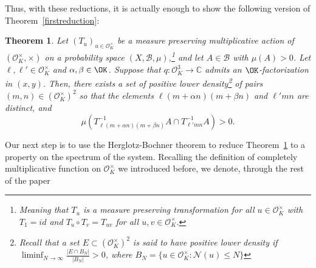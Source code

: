 \documentclass[11pt]{amsart}
\newtheorem{theorem}[lemma]{Theorem}
\theoremstyle{definition}
\newcommand{\C}{{\mathbb C}}
\newcommand{\NN}{{\mathcal N}}
\newcommand{\FM}[1]{{\color{violet}{{#1}}}}
\begin{document}
Thus, with these reductions, it is actually enough to show the following version of Theorem~\ref{firstreduction}:
\fi


\begin{theorem}\label{firstreductionplus}
Let $(T_u)_{u \in\mathcal{O}_K^{\times}}$ be a measure preserving multiplicative action of $(\mathcal{O}_K^{\times},\times)$ on a probability space $(X,\mathcal{B},\mu)$,\footnote{Meaning that $T_{u}$ is a measure preserving transformation for all $u \in\mathcal{O}_K^{\times}$ with $T_{1}=id$ and $T_{u}\circ T_{v}=T_{uv}$ for all $u,v\in\mathcal{O}_K^{\times}$.} and let $A \in \mathcal{B}$ with $\mu(A)>0$. Let $\ell,\ell' \in \mathcal{O}_K^{\times}$ and $\alpha, \beta \in \OK$. Suppose that $q: \mathcal{O}_K^3 \to \C$ admits an $\OK$-factorization in $(x,y)$. Then, there exists a set of positive lower density\footnote{Recall that a set $E \subset (\mathcal{O}_K^{\times})^2$ is said to have positive lower density if $\liminf_{N \to \infty} \frac{|E \cap B_N|}{|B_N|}>0$, where $B_N=\{ u \in \mathcal{O}_K^{\times} : \NN(u)\leq N\}$} of pairs $(m,n)\in (\mathcal{O}_K^{\times})^2$ so that the elements $\ell(m+\alpha n)(m+\beta n)$ and $\ell'mn$ are distinct, and
\begin{equation}\label{measurerec1plus}
\mu(T_{\ell(m+\alpha n)(m+\beta n)}^{-1}A \cap T_{\ell'mn}^{-1}A)>0.
\end{equation}
\end{theorem}


Our next step is to use the Herglotz-Bochner theorem to reduce Theorem~\ref{firstreductionplus} to a property on the spectrum of the system. Recalling the definition of completely multiplicative function on $\mathcal{O}_K^{\times}$ we introduced before, we denote, through the rest of the paper
\end{document}
